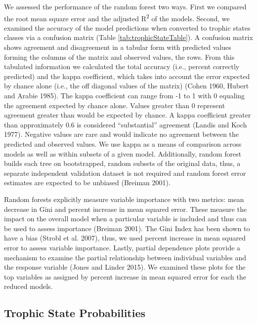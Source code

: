 \documentclass[12pt,]{article}
\begin{document}
We assessed the performance of the random forest two ways. First we
compared the root mean square error and the adjusted
R\textsuperscript{2} of the models. Second, we examined the accuracy of
the model predictions when converted to trophic states classes via a
confusion matrix (Table \ref{tab:trophicStateTable}). A confusion matrix
shows agreement and disagreement in a tabular form with predicted values
forming the columns of the matrix and observed values, the rows. From
this tabulated information we calculated the total accuracy (i.e.,
percent correctly predicted) and the kappa coefficient, which takes into
account the error expected by chance alone (i.e., the off diagonal
values of the matrix) (Cohen 1960, Hubert and Arabie 1985). The kappa
coefficient can range from -1 to 1 with 0 equaling the agreement
expected by chance alone. Values greater than 0 represent agreement
greater than would be expected by chance. A kappa coefficient greater
than approximately 0.6 is considered ``substantial'' agreement (Landis
and Koch 1977). Negative values are rare and would indicate no agreement
between the predicted and observed values. We use kappa as a means of
comparison across models as well as within subsets of a given model.
Additionally, random forest builds each tree on bootstrapped, random
subsets of the original data, thus, a separate independent validation
dataset is not required and random forest error estimates are expected
to be unbiased (Breiman 2001).

Random forests explicitly measure variable importance with two metrics:
mean decrease in Gini and percent increase in mean squared error. These
measure the impact on the overall model when a particular variable is
included and thus can be used to assess importance (Breiman 2001). The
Gini Index has been shown to have a bias (Strobl et al. 2007), thus, we
used percent increase in mean squared error to assess variable
importance. Lastly, partial dependence plots provide a mechanism to
examine the partial relationship between individual variables and the
response variable (Jones and Linder 2015). We examined these plots for
the top variables as assigned by percent increase in mean squared error
for each the reduced models.

\subsection{Trophic State
Probabilities}\label{trophic-state-probabilities}
\end{document}
